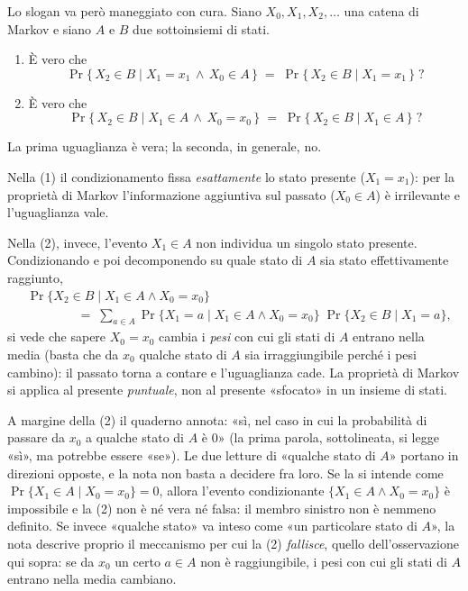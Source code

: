 Lo slogan va però maneggiato con cura. Siano $X_0, X_1, X_2, \dots$ una catena di
Markov e siano $A$ e $B$ due sottoinsiemi di stati.

\begin{domanda}
\begin{enumerate}
  \item È vero che
  \[
    \Pr\bigl\{\, X_2 \in B \;\big|\; X_1 = x_1 \,\wedge\, X_0 \in A \,\bigr\}
    \;=\;
    \Pr\bigl\{\, X_2 \in B \;\big|\; X_1 = x_1 \,\bigr\}\;?
  \]
  \item È vero che
  \[
    \Pr\bigl\{\, X_2 \in B \;\big|\; X_1 \in A \,\wedge\, X_0 = x_0 \,\bigr\}
    \;=\;
    \Pr\bigl\{\, X_2 \in B \;\big|\; X_1 \in A \,\bigr\}\;?
  \]
\end{enumerate}
\end{domanda}

La prima uguaglianza è vera; la seconda, in generale, no.

\begin{osservazione}
Nella (1) il condizionamento fissa \emph{esattamente} lo stato presente
($X_1 = x_1$): per la proprietà di Markov l'informazione aggiuntiva sul passato
($X_0 \in A$) è irrilevante e l'uguaglianza vale.

Nella (2), invece, l'evento $X_1 \in A$ non individua un singolo stato presente.
Condizionando e poi decomponendo su quale stato di $A$ sia stato effettivamente
raggiunto,
\begin{align*}
  &\Pr\bigl\{X_2 \in B \mid X_1 \in A \wedge X_0 = x_0\bigr\} \\[2pt]
  &\qquad\qquad =\;
  \sum_{a \in A}
    \Pr\bigl\{X_1 = a \mid X_1 \in A \wedge X_0 = x_0\bigr\}\;
    \Pr\bigl\{X_2 \in B \mid X_1 = a\bigr\},
\end{align*}
si vede che sapere $X_0 = x_0$ cambia i \emph{pesi} con cui gli stati di $A$
entrano nella media (basta che da $x_0$ qualche stato di $A$ sia irraggiungibile
perché i pesi cambino): il passato torna a contare e l'uguaglianza cade. La
proprietà di Markov si applica al presente \emph{puntuale}, non al presente
«sfocato» in un insieme di stati.
\end{osservazione}

\begin{dubbio}
A margine della (2) il quaderno annota: «sì, nel caso in cui la probabilità di
passare da $x_0$ a qualche stato di $A$ è $0$» (la prima parola, sottolineata, si
legge «sì», ma potrebbe essere «se»). Le due letture di «qualche stato di $A$»
portano in direzioni opposte, e la nota non basta a decidere fra loro. Se la si
intende come $\Pr\{X_1 \in A \mid X_0 = x_0\} = 0$, allora l'evento condizionante
$\{X_1 \in A \wedge X_0 = x_0\}$ è impossibile e la (2) non è né vera né falsa:
il membro sinistro non è nemmeno definito. Se invece «qualche stato» va inteso
come «un particolare stato di $A$», la nota descrive proprio il meccanismo per cui
la (2) \emph{fallisce}, quello dell'osservazione qui sopra: se da $x_0$ un certo
$a \in A$ non è raggiungibile, i pesi con cui gli stati di $A$ entrano nella media
cambiano.
\end{dubbio}


